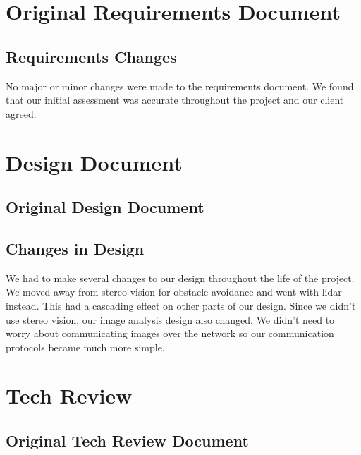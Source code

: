 \documentclass[compsoc,draftclsnofoot,onecolumn,10pt]{IEEEtran}
\begin{document}
\section{Original Requirements Document}



    \subsection{Requirements Changes}
    No major or minor changes were made to the requirements document. We found that our initial assessment was accurate throughout the project and our client agreed.



\section{Design Document}
    \subsection{Original Design Document}

    
    \subsection{Changes in Design}
    We had to make several changes to our design throughout the life of the project. We moved away from stereo vision for obstacle avoidance and went with lidar instead. This had a cascading effect on other parts of our design. Since we didn't use stereo vision, our image analysis design also changed. We didn't need to worry about communicating images over the network so our communication protocols became much more simple.
    

\section{Tech Review}
    \subsection{Original Tech Review Document}

\end{document}
